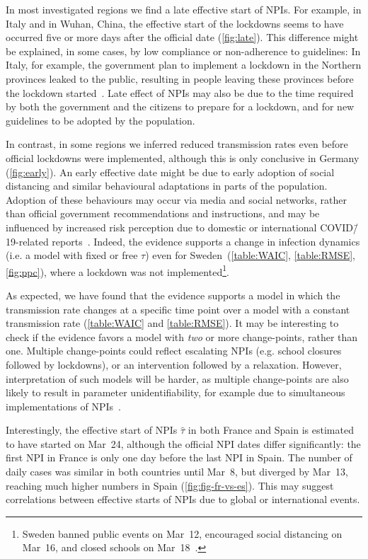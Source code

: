 \documentclass[12pt]{extarticle}
\begin{document}
In most investigated regions we find a late effective start of NPIs.
For example, in Italy and in Wuhan, China, the effective start of the lockdowns seems to have occurred five or more days after the official date (\autoref{fig:late}).
This difference might be explained, in some cases, by low compliance or non-adherence to guidelines: In Italy, for example, the government plan to implement a lockdown in the Northern provinces leaked to the public, resulting in people leaving these provinces before the lockdown started~\citep{Gatto2020}.
Late effect of NPIs may also be due to the time required by both the government and the citizens to prepare for a lockdown, and for new guidelines to be adopted by the population.
 
In contrast, in some regions we inferred reduced transmission rates even before official lockdowns were implemented, although this is only conclusive in Germany (\autoref{fig:early}).
An early effective date might be due to early adoption of social distancing and similar behavioural adaptations in parts of the population.
Adoption of these behaviours may occur via media and social networks, rather than official government recommendations and instructions, and may be influenced by increased risk perception due to domestic or international COVID\=/19-related reports~\citep{Arthur2020}.
Indeed, the evidence supports a change in infection dynamics (i.e. a model with fixed or free $\tau$) even for Sweden~(\autoref{table:WAIC}, \autoref{table:RMSE}, \autoref{fig:ppc}), where a lockdown was not implemented\footnote{Sweden banned public events on Mar~12, encouraged social distancing on Mar~16, and closed schools on Mar~18~\citep{Flaxman2020}.}.

As expected, we have found that the evidence supports a model in which the transmission rate changes at a specific time point over a model with a constant transmission rate (\autoref{table:WAIC} and \autoref{table:RMSE}).
It may be interesting to check if the evidence favors a model with \emph{two} or more change-points, rather than one. 
Multiple change-points could reflect escalating NPIs (e.g. school closures followed by lockdowns), or an intervention followed by a relaxation.
However, interpretation of such models will be harder, as multiple change-points are also likely to result in parameter unidentifiability, for example due to simultaneous implementations of NPIs~\citep{Flaxman2020}.

Interestingly, the effective start of NPIs $\hat{\tau}$ in both France and Spain is estimated to have started on Mar~24, although the official NPI dates differ significantly: the first NPI in France is only one day before the last NPI in Spain.
The number of daily cases was similar in both countries until Mar~8, but diverged by Mar~13, reaching much higher numbers in Spain (\autoref{fig:fig-fr-vs-es}).
This may suggest correlations between effective starts of NPIs due to global or international events.
\end{document}
